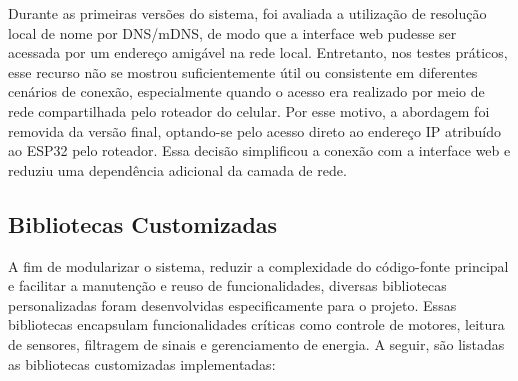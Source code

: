 \documentclass[	12pt, Times, openright, twoside, a4paper, english, brazil]{abntex2}
\begin{document}
Durante as primeiras versões do sistema, foi avaliada a utilização de resolução local de nome por DNS/mDNS, de modo que a interface web pudesse ser acessada por um endereço amigável na rede local. Entretanto, nos testes práticos, esse recurso não se mostrou suficientemente útil ou consistente em diferentes cenários de conexão, especialmente quando o acesso era realizado por meio de rede compartilhada pelo roteador do celular. Por esse motivo, a abordagem foi removida da versão final, optando-se pelo acesso direto ao endereço IP atribuído ao ESP32 pelo roteador. Essa decisão simplificou a conexão com a interface web e reduziu uma dependência adicional da camada de rede.

\subsection{Bibliotecas Customizadas}

A fim de modularizar o sistema, reduzir a complexidade do código-fonte principal e facilitar a manutenção e reuso de funcionalidades, diversas bibliotecas personalizadas foram desenvolvidas especificamente para o projeto. Essas bibliotecas encapsulam funcionalidades críticas como controle de motores, leitura de sensores, filtragem de sinais e gerenciamento de energia. A seguir, são listadas as bibliotecas customizadas implementadas:
\end{document}
